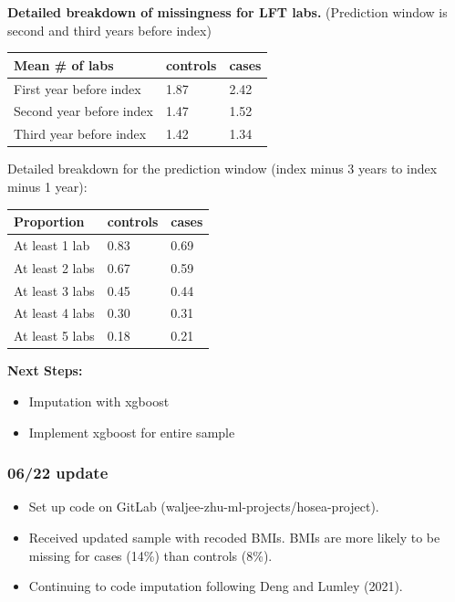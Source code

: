 \documentclass[12pt]{article}
\begin{document}
\pagebreak

\textbf{Detailed breakdown of missingness for LFT labs.} (Prediction window is second and third years before index)
\begin{center}
\begin{tabular}{|l|l|l|}
\hline
\textbf{Mean \# of labs} & controls & cases \\ \hline
First year before index & 1.87 & 2.42 \\ \hline
Second year before index & 1.47 & 1.52 \\ \hline
Third year before index & 1.42 & 1.34 \\ \hline
\end{tabular}
\end{center}
Detailed breakdown for the prediction window (index minus 3 years to index minus 1 year):
\begin{center}
\begin{tabular}{|l|l|l|}
\hline
\textbf{Proportion} & controls & cases \\ \hline
At least 1 lab & 0.83 & 0.69 \\ \hline
At least 2 labs & 0.67 & 0.59 \\ \hline
At least 3 labs & 0.45 & 0.44 \\ \hline
At least 4 labs & 0.30 & 0.31 \\ \hline
At least 5 labs & 0.18 & 0.21 \\ \hline
\end{tabular}
\end{center}

\textbf{Next Steps:}
\begin{itemize}
  \item Imputation with xgboost
  \item Implement xgboost for entire sample
\end{itemize}

\pagebreak

\subsubsection*{06/22 update}

\begin{itemize}
  \item Set up code on GitLab (waljee-zhu-ml-projects/hosea-project).
  \item Received updated sample with recoded BMIs. BMIs are more likely to be missing for cases (14\%) than controls (8\%).
  \item Continuing to code imputation following Deng and Lumley (2021).
\end{itemize}
\end{document}
